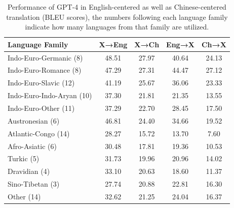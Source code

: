 \documentclass[acmsmall]{acmart}
\begin{document}
\begin{table}[htbp]
    \centering
    \caption{Performance of GPT-4 in English-centered as well as Chinese-centered translation (BLEU scores), the numbers following each language family indicate how many languages from that family are utilized.}
	\label{tab:A} 
    \begin{tabular}{lcccc}
        \toprule
        Language Family & X→Eng & X→Ch & Eng→X & Ch→X \\
        \midrule
        Indo-Euro-Germanic (8) & 48.51 & 27.97 & 40.64 & 24.13 \\
        Indo-Euro-Romance (8) & 47.29 & 27.31 & 44.47 & 27.12 \\
        Indo-Euro-Slavic (12) & 41.19 & 25.67 & 36.06 & 23.33 \\
        Indo-Euro-Indo-Aryan (10) & 37.30 & 21.81 & 21.35 & 13.55 \\
        Indo-Euro-Other (11) & 37.29 & 22.70 & 28.45 & 17.50 \\
        Austronesian (6) & 46.81 & 24.40 & 34.66 & 19.52 \\
        Atlantic-Congo (14) & 28.27 & 15.72 & 13.70 & 7.60 \\
        Afro-Asiatic (6) & 30.48 & 17.81 & 19.36 & 10.53 \\
        Turkic (5) & 31.73 & 19.96 & 20.96 & 14.02 \\
        Dravidian (4) & 33.10 & 20.63 & 18.60 & 11.37 \\
        Sino-Tibetan (3) & 27.74 & 20.88 & 22.81 & 16.30 \\
        Other (14) & 32.62 & 21.25 & 24.04 & 16.37 \\
        \bottomrule
    \end{tabular}

\end{table}
\end{document}
